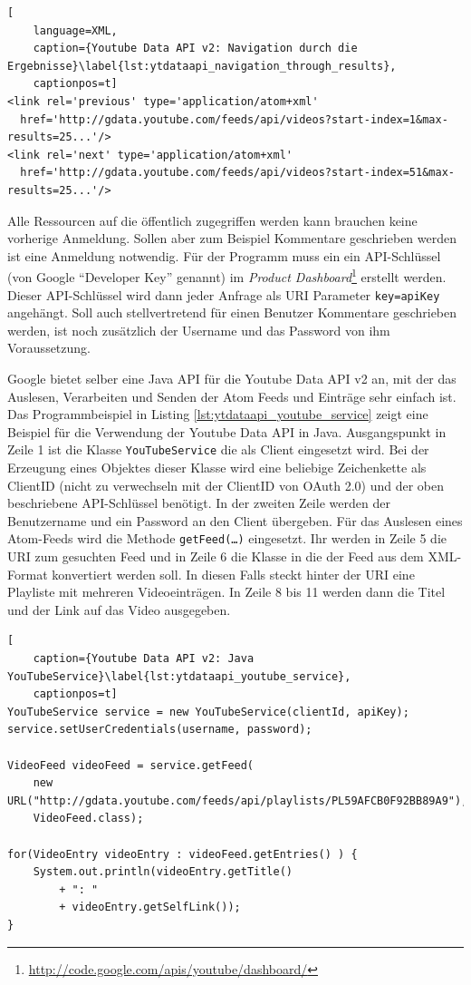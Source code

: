 \begin{lstlisting}[
    language=XML,
    caption={Youtube Data API v2: Navigation durch die Ergebnisse}\label{lst:ytdataapi_navigation_through_results},
    captionpos=t]
<link rel='previous' type='application/atom+xml'
  href='http://gdata.youtube.com/feeds/api/videos?start-index=1&max-results=25...'/>
<link rel='next' type='application/atom+xml'
  href='http://gdata.youtube.com/feeds/api/videos?start-index=51&max-results=25...'/>
\end{lstlisting}

Alle Ressourcen auf die öffentlich zugegriffen werden kann brauchen keine vorherige Anmeldung. Sollen aber zum Beispiel Kommentare geschrieben werden ist eine Anmeldung notwendig. Für der Programm muss ein ein API-Schlüssel (von Google \enquote{Developer Key} genannt) im \emph{Product Dashboard}\footnote{\url{http://code.google.com/apis/youtube/dashboard/}} erstellt werden. Dieser API-Schlüssel wird dann jeder Anfrage als URI Parameter \texttt{key={apiKey}} angehängt. Soll auch stellvertretend für einen Benutzer Kommentare geschrieben werden, ist noch zusätzlich der Username und das Password von ihm Voraussetzung.

Google bietet selber eine Java API für die Youtube Data API v2 an, mit der das Auslesen, Verarbeiten und Senden der Atom Feeds und Einträge sehr einfach ist. Das Programmbeispiel in Listing \ref{lst:ytdataapi_youtube_service} zeigt eine Beispiel für die Verwendung der Youtube Data API in Java. Ausgangspunkt in Zeile 1 ist die Klasse \texttt{YouTubeService} die als Client eingesetzt wird. Bei der Erzeugung eines Objektes dieser Klasse wird eine beliebige Zeichenkette als ClientID (nicht zu verwechseln mit der ClientID von OAuth 2.0) und der oben beschriebene API-Schlüssel benötigt. In der zweiten Zeile werden der Benutzername und ein Password an den Client übergeben. Für das Auslesen eines Atom-Feeds wird die Methode \texttt{getFeed(\dots)} eingesetzt. Ihr werden in Zeile 5 die URI zum gesuchten Feed und in Zeile 6 die Klasse in die der Feed aus dem XML-Format konvertiert werden soll. In diesen Falls steckt hinter der URI eine Playliste mit mehreren Videoeinträgen. In Zeile 8 bis 11 werden dann die Titel und der Link auf das Video ausgegeben.

\begin{lstlisting}[
    caption={Youtube Data API v2: Java YouTubeService}\label{lst:ytdataapi_youtube_service},
    captionpos=t]
YouTubeService service = new YouTubeService(clientId, apiKey);
service.setUserCredentials(username, password);

VideoFeed videoFeed = service.getFeed(
    new URL("http://gdata.youtube.com/feeds/api/playlists/PL59AFCB0F92BB89A9"), 
    VideoFeed.class);

for(VideoEntry videoEntry : videoFeed.getEntries() ) {
    System.out.println(videoEntry.getTitle() 
        + ": " 
        + videoEntry.getSelfLink());
}
\end{lstlisting}

